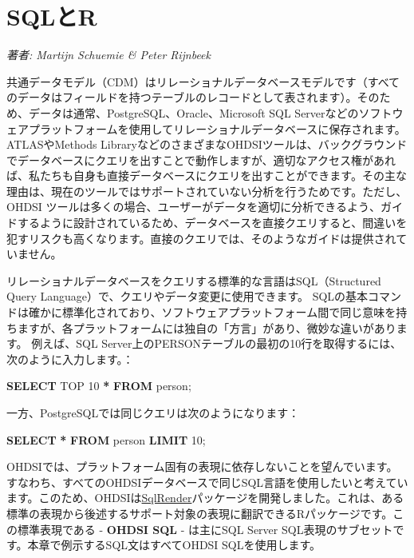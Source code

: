 \documentclass[
  11pt]{book}
\newenvironment{Shaded}{\begin{snugshade}}{\end{snugshade}}
\newcommand{\DecValTok}[1]{\textcolor[rgb]{0.00,0.00,0.81}{#1}}
\newcommand{\KeywordTok}[1]{\textcolor[rgb]{0.13,0.29,0.53}{\textbf{#1}}}
\newcommand{\NormalTok}[1]{#1}
\newcommand{\OperatorTok}[1]{\textcolor[rgb]{0.81,0.36,0.00}{\textbf{#1}}}
\theoremstyle{definition}
\theoremstyle{definition}
\theoremstyle{definition}
\theoremstyle{definition}
\theoremstyle{remark}
\begin{document}
\chapter{SQLとR}\label{SqlAndR}

\emph{著者: Martijn Schuemie \& Peter Rijnbeek}

共通データモデル（CDM）はリレーショナルデータベースモデルです（すべてのデータはフィールドを持つテーブルのレコードとして表されます）。そのため、データは通常、PostgreSQL、Oracle、Microsoft SQL Serverなどのソフトウェアプラットフォームを使用してリレーショナルデータベースに保存されます。ATLASやMethods LibraryなどのさまざまなOHDSIツールは、バックグラウンドでデータベースにクエリを出すことで動作しますが、適切なアクセス権があれば、私たちも自身も直接データベースにクエリを出すことができます。その主な理由は、現在のツールではサポートされていない分析を行うためです。ただし、OHDSI ツールは多くの場合、ユーザーがデータを適切に分析できるよう、ガイドするように設計されているため、データベースを直接クエリすると、間違いを犯すリスクも高くなります。直接のクエリでは、そのようなガイドは提供されていません。

リレーショナルデータベースをクエリする標準的な言語はSQL（Structured Query Language）で、クエリやデータ変更に使用できます。 SQLの基本コマンドは確かに標準化されており、ソフトウェアプラットフォーム間で同じ意味を持ちますが、各プラットフォームには独自の「方言」があり、微妙な違いがあります。 例えば、SQL Server上のPERSONテーブルの最初の10行を取得するには、次のように入力します。：  

\begin{Shaded}
\begin{Highlighting}[]
\KeywordTok{SELECT}\NormalTok{ TOP }\DecValTok{10} \OperatorTok{*} \KeywordTok{FROM}\NormalTok{ person;}
\end{Highlighting}
\end{Shaded}

一方、PostgreSQLでは同じクエリは次のようになります：

\begin{Shaded}
\begin{Highlighting}[]
\KeywordTok{SELECT} \OperatorTok{*} \KeywordTok{FROM}\NormalTok{ person }\KeywordTok{LIMIT} \DecValTok{10}\NormalTok{;}
\end{Highlighting}
\end{Shaded}

OHDSIでは、プラットフォーム固有の表現に依存しないことを望んでいます。すなわち、すべてのOHDSIデータベースで同じSQL言語を使用したいと考えています。このため、OHDSIは\href{https://ohdsi.github.io/SqlRender/}{SqlRender}パッケージを開発しました。これは、ある標準の表現から後述するサポート対象の表現に翻訳できるRパッケージです。この標準表現である - \textbf{OHDSI SQL} - は主にSQL Server SQL表現のサブセットです。本章で例示するSQL文はすべてOHDSI SQLを使用します。    
\end{document}
